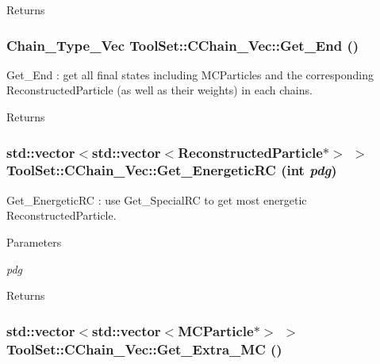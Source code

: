 \begin{DoxyReturn}{Returns}

\end{DoxyReturn}
\hypertarget{classToolSet_1_1CChain__Vec_a3e682d89901496518b5bfa54533b6f59}{
\subsubsection[{Get\_\-End}]{\setlength{\rightskip}{0pt plus 5cm}Chain\_\-Type\_\-Vec ToolSet::CChain\_\-Vec::Get\_\-End ()}}
\label{classToolSet_1_1CChain__Vec_a3e682d89901496518b5bfa54533b6f59}


Get\_\-End : get all final states including MCParticles and the corresponding ReconstructedParticle (as well as their weights) in each chains. \begin{DoxyReturn}{Returns}

\end{DoxyReturn}
\hypertarget{classToolSet_1_1CChain__Vec_a820a5e8d1bde159334145996758d085e}{
\subsubsection[{Get\_\-EnergeticRC}]{\setlength{\rightskip}{0pt plus 5cm}std::vector$<$std::vector$<$ReconstructedParticle$\ast$$>$ $>$ ToolSet::CChain\_\-Vec::Get\_\-EnergeticRC (int {\em pdg})}}
\label{classToolSet_1_1CChain__Vec_a820a5e8d1bde159334145996758d085e}


Get\_\-EnergeticRC : use Get\_\-SpecialRC to get most energetic ReconstructedParticle. 
\begin{DoxyParams}{Parameters}
\item[{\em pdg}]\end{DoxyParams}
\begin{DoxyReturn}{Returns}

\end{DoxyReturn}
\hypertarget{classToolSet_1_1CChain__Vec_ac0d39c70d1e3f0498374b1549ea34019}{
\subsubsection[{Get\_\-Extra\_\-MC}]{\setlength{\rightskip}{0pt plus 5cm}std::vector$<$std::vector$<$MCParticle$\ast$$>$ $>$ ToolSet::CChain\_\-Vec::Get\_\-Extra\_\-MC ()}}
\label{classToolSet_1_1CChain__Vec_ac0d39c70d1e3f0498374b1549ea34019}


